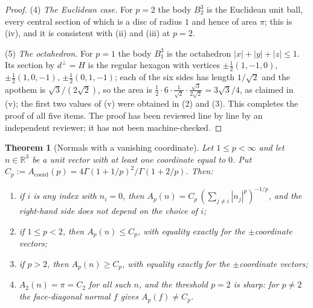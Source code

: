 \documentclass[11pt]{article}
\theoremstyle{plain}
\newtheorem{theorem}{Theorem}
\numberwithin{theorem}{section}
\begin{document}
\begin{proof}
(4) \emph{The Euclidean case.} For $p=2$ the body $B_2^3$ is the Euclidean unit ball, every central section of which is a disc of radius $1$ and hence of area $\pi$; this is (iv), and it is consistent with (ii) and (iii) at $p=2$.

(5) \emph{The octahedron.} For $p=1$ the body $B_1^3$ is the octahedron $|x|+|y|+|z|\le1$. Its section by $d^{\perp}=H$ is the regular hexagon with vertices $\pm\tfrac12(1,-1,0)$, $\pm\tfrac12(1,0,-1)$, $\pm\tfrac12(0,1,-1)$; each of the six sides has length $1/\sqrt2$ and the apothem is $\sqrt3/(2\sqrt2)$, so the area is $\tfrac12\cdot6\cdot\tfrac{1}{\sqrt2}\cdot\tfrac{\sqrt3}{2\sqrt2}=3\sqrt3/4$, as claimed in (v); the first two values of (v) were obtained in (2) and (3). This completes the proof of all five items. The proof has been reviewed line by line by an independent reviewer; it has not been machine-checked.
\end{proof}

\begin{theorem}[Normals with a vanishing coordinate]\label{thm:zero}
Let $1\le p<\infty$ and let $n\in\mathbb{R}^3$ be a unit vector with at least one coordinate equal to $0$. Put $C_p:=A_{\mathrm{coord}}(p)=4\Gamma(1+1/p)^2/\Gamma(1+2/p)$. Then:
\begin{enumerate}
\item[(i)] if $i$ is any index with $n_i=0$, then $A_p(n)=C_p\,(\sum_{j\ne i}|n_j|^p)^{-1/p}$, and the right-hand side does not depend on the choice of $i$;
\item[(ii)] if $1\le p<2$, then $A_p(n)\le C_p$, with equality exactly for the $\pm$coordinate vectors;
\item[(iii)] if $p>2$, then $A_p(n)\ge C_p$, with equality exactly for the $\pm$coordinate vectors;
\item[(iv)] $A_2(n)=\pi=C_2$ for all such $n$, and the threshold $p=2$ is sharp: for $p\ne2$ the face-diagonal normal $f$ gives $A_p(f)\ne C_p$.
\end{enumerate}
\end{theorem}
\end{document}
